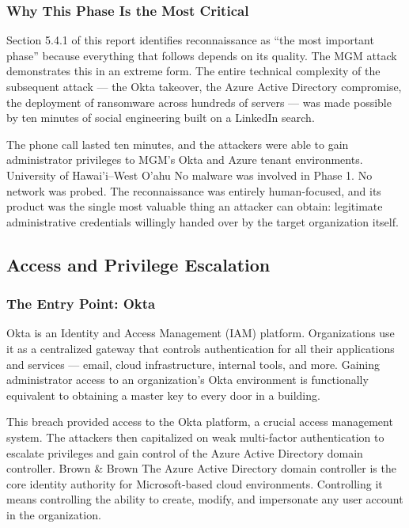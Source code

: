 \subsubsection{Why This Phase Is the Most Critical}

Section 5.4.1 of this report identifies reconnaissance as ``the most important phase'' because everything that follows depends on its quality. The MGM attack demonstrates this in an extreme form. The entire technical complexity of the subsequent attack — the Okta takeover, the Azure Active Directory compromise, the deployment of ransomware across hundreds of servers — was made possible by ten minutes of social engineering built on a LinkedIn search.

The phone call lasted ten minutes, and the attackers were able to gain administrator privileges to MGM's Okta and Azure tenant environments. University of Hawai'i--West O'ahu No malware was involved in Phase 1. No network was probed. The reconnaissance was entirely human-focused, and its product was the single most valuable thing an attacker can obtain: legitimate administrative credentials willingly handed over by the target organization itself.

\subsection{Access and Privilege Escalation}

\subsubsection{The Entry Point: Okta}

Okta is an Identity and Access Management (IAM) platform. Organizations use it as a centralized gateway that controls authentication for all their applications and services — email, cloud infrastructure, internal tools, and more. Gaining administrator access to an organization's Okta environment is functionally equivalent to obtaining a master key to every door in a building.

This breach provided access to the Okta platform, a crucial access management system. The attackers then capitalized on weak multi-factor authentication to escalate privileges and gain control of the Azure Active Directory domain controller. Brown \& Brown The Azure Active Directory domain controller is the core identity authority for Microsoft-based cloud environments. Controlling it means controlling the ability to create, modify, and impersonate any user account in the organization.

